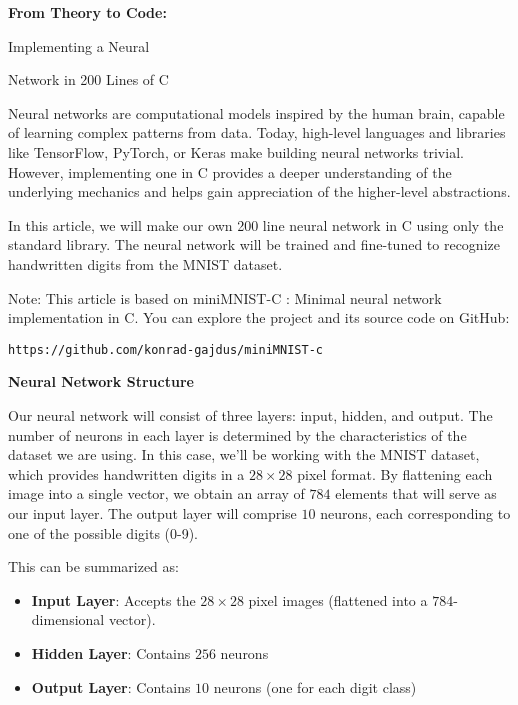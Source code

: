 
{}
\large
{\Huge\noindent\bf From Theory to Code:

\noindent Implementing a Neural
\vspace{2mm}

\noindent Network in 200 Lines of C}
\vspace{5mm}

Neural networks are computational models inspired by the human brain, capable
of learning complex patterns from data. Today, high-level languages and
libraries like TensorFlow, PyTorch, or Keras make building neural networks
trivial. However, implementing one in C provides a deeper understanding of the
underlying mechanics and helps gain appreciation of the higher-level
abstractions.

In this article, we will make our own 200 line neural network in C using only
the standard library. The neural network will be trained and fine-tuned to
recognize handwritten digits from the MNIST dataset.

Note: This article is based on miniMNIST-C : Minimal neural network
implementation in C. You can explore the project and its source code on
GitHub: \begin{verbatim}https://github.com/konrad-gajdus/miniMNIST-c\end{verbatim}

\vspace{5mm}
{\noindent\huge\bf Neural Network Structure}
\vspace{5mm}

Our neural network will consist of three layers: input, hidden, and output. The
number of neurons in each layer is determined by the characteristics of the
dataset we are using. In this case, we'll be working with the MNIST dataset,
which provides handwritten digits in a $28 \times 28$ pixel format. By flattening each
image into a single vector, we obtain an array of $784$ elements that will serve
as our input layer. The output layer will comprise $10$ neurons, each
corresponding to one of the possible digits (0-9).

This can be summarized as:

\begin{itemize}
    \item {\bf Input Layer}: Accepts the $28 \times 28$ pixel images (flattened into a
$784$-dimensional vector).

    \item {\bf Hidden Layer}: Contains $256$ neurons

    \item {\bf Output Layer}: Contains $10$ neurons (one for each digit class)
\end{itemize}

